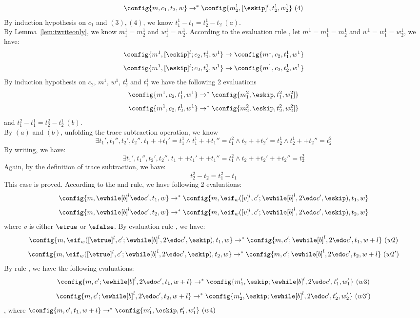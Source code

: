 {\begin{subproof}
\[\]
%
%
\[
\config{m, c_1, t_2, w} \to^{*} \config{m_2^1, [\eskip]^l,  t_2^1, w_2^1} ~ (4)
\]
%
%
By induction hypothesis on $c_1$ and $(3), (4)$, we know $t_1^1 - t_1 = t_2^1 - t_2 ~ (a)$.
%
\\
%
By Lemma~\ref{lem:twriteonly}, we know $m_1^1= m_2^1$ and $w_1^1= w_2^1$.
%
%
According to the evaluation rule , let $m^1 = m_1^1= m_2^1$ and $w^1 = w_1^1= w_2^1$, we have:
%
\[
\config{m^1, [\eskip]^l;c_2, t_1^1, w^1} \to \config{m^1, c_2, t_1^1, w^1}
\]
%
\[
\config{m^1, [\eskip]^l;c_2, t_2^1, w^1} \to \config{m^1, c_2, t_2^1, w^1}
\]
%
%
By induction hypothesis on $c_2$, $m^1$, $w^1$, $t_2^1$ and $t_1^1$ we have the following 2 evaluations 
%
\[
	\config{m^1, c_2, t_1^1, w^1} \to^{*} \config{m_1^2, \eskip, t_1^2, w_1^2]}
\]
%
\[
	\config{m^1, c_2, t_2^1, w^1} \to^{*} \config{m_2^2, \eskip, t_2^2, w_2^2]}
\]
%
and $t_1^2 - t_1^1 = t_2^2 - t_2^1 ~ (b)$.
%
\\
By $(a)$ and $(b)$, unfolding the trace subtraction operation, we know
%
\[
\exists t_1', t_1'', t_2', t_2''. ~ 
t_1 ++ t_1' = t_1^1 \land t_1^1 ++ t_1'' = t_1^2 
\land t_2 ++ t_2' = t_2^1 \land t_2^1 ++ t_2'' = t_2^2 
\]
%
By writing, we have:
%
\[
\exists t_1', t_1'', t_2', t_2''. ~ 
t_1 ++ t_1' ++ t_1'' = t_1^2 
\land t_2 ++ t_2' ++ t_2'' = t_2^2 
\]
%
Again, by the definition of trace subtraction, we have:
%
\[
	t_2^2 - t_2 = t_1^2 - t_1
\]
%
This case is proved.
%
%
According to the  and  rule, we have following 2 evaluations:
%
\[
	\config{m, \ewhile [b]^l \edo c', t_1, w} \to^{*}
	\config{m, \eif_w([v]^l, c'; \ewhile [b]^l, 2 \edo c', \eskip), t_1, w}
\]
%
\[
	\config{m, \ewhile [b]^l \edo c', t_2, w} \to^{*}
	\config{m, \eif_w([v]^l, c'; \ewhile [b]^l, 2 \edo c', \eskip), t_2, w}
\]
%
where $v$ is either $\etrue$ or $\efalse$.
%
%
By evaluation rule , we have:
%
\[
	\config{m, \eif_w([\etrue]^l, c';\ewhile [b]^l, 2 \edo c', \eskip), t_1, w} 
	\to^{*} \config{m, c';\ewhile [b]^l , 2 \edo c', t_1, w+l} ~ (w2)
\]
%
\[
	\config{m, \eif_w([\etrue]^l, c';\ewhile [b]^l, 2 \edo c', \eskip), t_2, w} 
	\to^{*} \config{m, c';\ewhile [b]^l, 2 \edo c', t_2, w+l} ~ (w2')
\]
%
%
By rule , we have the following evaluations:
%
\[
	\config{m, c';\ewhile [b]^l, 2 \edo c', t_1, w+l} \to^{*} \config{m_1', \eskip;\ewhile [b]^l, 2 \edo c', t_1', w_1'}
	~ (w3)
\] 
%
%
\[
	\config{m, c';\ewhile [b]^l , 2 \edo c', t_2, w+l} \to^{*} \config{m_2', \eskip;\ewhile [b]^l, 2 \edo c', t_2', w_2'}
	~ (w3')
\] 
%
, where 
$\config{m, c', t_1, w+l} \to^{*} \config{m_1', \eskip, t_1', w_1'} ~ (w4)$

\end{subproof}}
